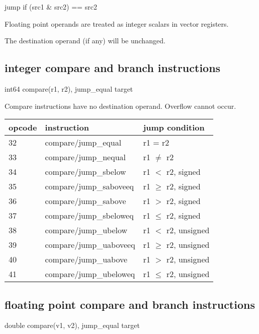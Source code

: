 \documentclass[forwardcom.tex]{subfiles}
\begin{document}
jump if (src1 \& src2) == src2
\vspace{2mm}

Floating point operands are treated as integer scalars in vector registers.
\vspace{2mm}

The destination operand (if any) will be unchanged.


\subsection{integer compare and branch instructions}
int64 compare(r1, r2), jump\_equal target
\vspace{2mm}

Compare instructions have no destination operand. 
Overflow cannot occur.
\vspace{2mm}

\label{table:integerCompareJumpInstructions}
\begin{tabular}{|p{12mm}|p{60mm}|p{50mm}|}
\hline
\bfseries opcode & \bfseries instruction & \bfseries jump condition \\ \hline
32 & compare/jump\_equal & r1 = r2 \\ \hline
33 & compare/jump\_nequal  & r1 $\neq$ r2 \\ \hline
34 & compare/jump\_sbelow & r1 $<$ r2, signed \\ \hline
35 & compare/jump\_saboveeq & r1 $\geq$ r2, signed \\ \hline
36 & compare/jump\_sabove & r1 $>$ r2, signed  \\ \hline
37 & compare/jump\_sbeloweq  & r1 $\leq$ r2, signed \\ \hline
38 & compare/jump\_ubelow & r1 $<$ r2, unsigned \\ \hline
39 & compare/jump\_uaboveeq  & r1 $\geq$ r2, unsigned \\ \hline
40 & compare/jump\_uabove & r1 $>$ r2, unsigned \\ \hline
41 & compare/jump\_ubeloweq  & r1 $\leq$ r2, unsigned \\ \hline
\end{tabular}
\vspace{2mm}


\subsection{floating point compare and branch instructions}
double compare(v1, v2), jump\_equal target
\vspace{2mm}
\end{document}
